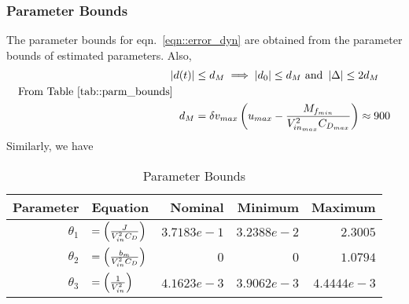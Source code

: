 \subsubsection{Parameter Bounds}
The parameter bounds for eqn.~\ref{eqn::error_dyn} are obtained from the
parameter bounds of estimated parameters. Also,
\begin{align*}
    \left\lvert d(t) \right\rvert &\leq d_M \implies \left\lvert d_0 \right\rvert \leq d_M \text{  and  } \left\lvert \Delta \right\rvert \leq 2d_M\\
    \text{From Table~\ref{tab::parm_bounds}} \qquad &\\
    d_M &= \delta v_{max} \left( u_{max} - \frac{M_{f_{min}}}{V_{in_{max}}^2 C_{D_{max}}} \right) \approx 900
\end{align*}
Similarly, we have
\begin{table}[H]
    \centering
    \begin{tabular}{r l r r r}
        \hline \hline
        Parameter & Equation & Nominal & Minimum & Maximum\\ \hline \hline
        $\theta_1$ &
        $= \left( \frac{J}{V_{in}^2 C_D} \right)$ &
        $3.7183e-1$ &
        $3.2388e-2$ &
        $2.3005$
        \\
        $\theta_2$ &
        $= \left( \frac{b_m}{V_{in}^2 C_D} \right)$ &
        $0$ &
        $0$ &
        $1.0794$
        \\
        $\theta_3$ &
        $= \left( \frac{1}{V_{in}^2} \right)$ &
        $4.1623e-3$ &
        $3.9062e-3$ &
        $4.4444e-3$
        \\
        \hline \hline
    \end{tabular}
    \caption{Parameter Bounds}
    \label{tab::parm_lims}
\end{table}
